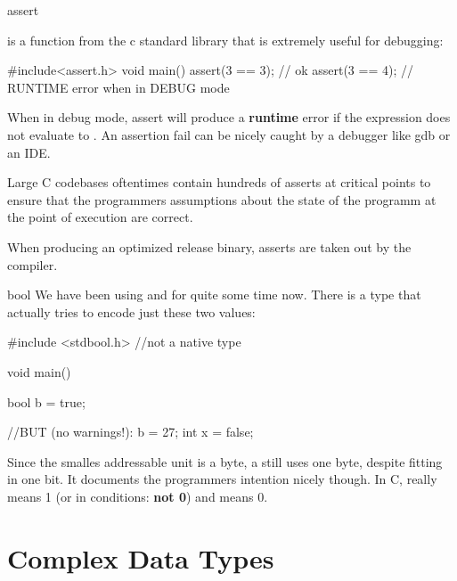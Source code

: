 \documentclass[10pt,graphics,aspectratio=169,table]{beamer}
\begin{document}
\begin{frame}[fragile]{assert}

 is a function from the c standard library that is extremely useful 
for debugging:

\begin{codeblock}
#include<assert.h> 
void main(){ 
    assert(3 == 3); // ok
    assert(3 == 4); // RUNTIME error when in DEBUG mode
}
\end{codeblock}

When in debug mode, assert will produce a \textbf{runtime} error if the
expression does not evaluate to . An assertion fail can be
nicely caught by a debugger like gdb or an IDE.

Large C codebases oftentimes contain hundreds of asserts at critical points
to ensure that the programmers assumptions about the state of the programm
at the point of execution are correct. 

When producing an optimized release binary, asserts are taken out
by the compiler. 

\end{frame} 

\begin{frame}[fragile]{bool}
    We have been using  and  for quite some time now.
    There is a type that actually tries to encode just these two values: 
    \begin{codeblock}
#include <stdbool.h> //not a native type

void main(){
    bool b = true;
    
    //BUT (no warnings!): 
    b = 27; 
    int x = false;
}
    \end{codeblock}

    Since the smalles addressable unit is a byte, a  still uses one
    byte, despite fitting in one bit. It documents the programmers intention 
    nicely though. In C,  really means 1 (or in conditions: \textbf{not 0})
    and  means 0.
\end{frame} 

\section{Complex Data Types}
\end{document}
